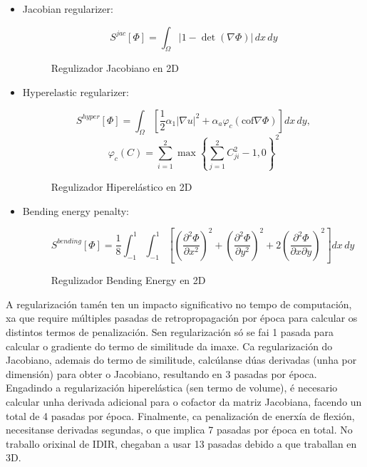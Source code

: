  \begin{itemize}
    \item Jacobian regularizer:
    \begin{figure}[ht!]
        \centering
        \[
        S^{jac}[\Phi] = \int_{\Omega} \left| 1 - \det \left( \nabla \Phi \right) \right| \, dx \, dy
        \]
        \caption{Regulizador Jacobiano en 2D}
    \end{figure}
    
    \item Hyperelastic regularizer:
    \begin{figure}[ht!]
        \centering
        \[
        S^{hyper}[\Phi] = \int_{\Omega} \left[ \frac{1}{2} \alpha_1 |\nabla u|^2 + \alpha_a \varphi_c (\text{cof} \nabla \Phi) \right] dx \, dy,
        \]
        \[
        \varphi_c(C) = \sum_{i=1}^2 \max \left\{ \sum_{j=1}^2 C_{ji}^2 - 1, 0 \right\}^2
        \]
        \caption{Regulizador Hiperelástico en 2D}
    \end{figure}
    
    \item Bending energy penalty:
    \begin{figure}[ht!]
        \centering
        \[
        S^{bending}[\Phi] = \frac{1}{8} \int_{-1}^{1} \int_{-1}^{1} \left[ \left( \frac{\partial^2 \Phi}{\partial x^2} \right)^2 + \left( \frac{\partial^2 \Phi}{\partial y^2} \right)^2 + 2 \left( \frac{\partial^2 \Phi}{\partial x \partial y} \right)^2 \right] dx \, dy
        \]
        \caption{Regulizador Bending Energy en 2D}
    \end{figure}
    
\end{itemize}

A regularización tamén ten un impacto significativo no tempo de computación, xa que require múltiples pasadas de retropropagación por época para calcular os distintos termos de penalización.
Sen regularización só se fai 1 pasada para calcular o gradiente do termo de similitude da imaxe.
Ca regularización do Jacobiano, ademais do termo de similitude, calcúlanse dúas derivadas (unha por dimensión) para obter o Jacobiano, resultando en 3 pasadas por época.
Engadindo a regularización hiperelástica (sen termo de volume), é necesario calcular unha derivada adicional para o cofactor da matriz Jacobiana, facendo un total de 4 pasadas por época.
Finalmente, ca penalización de enerxía de flexión, necesitanse derivadas segundas, o que implica 7 pasadas por época en total.
No traballo orixinal de IDIR, chegaban a usar 13 pasadas debido a que traballan en 3D.

